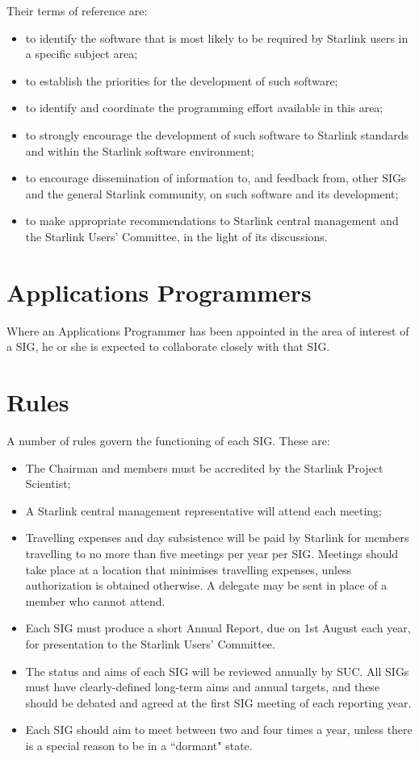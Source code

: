 Their terms of reference are:
\begin{itemize}
\item to identify the software that is most likely to be required by Starlink
users in a specific subject area;
\item to establish the priorities for the development of such software;
\item to identify and coordinate the programming effort available in this area;
\item to strongly encourage the development of such software to Starlink
standards and within the Starlink software environment;
\item to encourage dissemination of information to, and feedback from, other
SIGs and the general Starlink community, on such software and its development;
\item to make appropriate recommendations to Starlink central management and the
Starlink Users' Committee, in the light of its discussions.
\end{itemize}

\section{Applications Programmers}

Where an Applications Programmer has been appointed in the area of
interest of a SIG, he or she is expected to collaborate closely with that SIG.

\section{Rules}

A number of rules govern the functioning of each SIG.
These are:
\begin{itemize}
\item The Chairman and members must be accredited by the Starlink Project
Scientist;
\item A Starlink central management representative will attend each meeting;
\item Travelling expenses and day subsistence will be paid by Starlink for
members travelling to no more than five meetings per year per SIG.
Meetings should take place at a location that minimises travelling expenses,
unless authorization is obtained otherwise.
A delegate may be sent in place of a member who cannot attend.
\item Each SIG must produce a short Annual Report, due on 1st August each year,
for presentation to the Starlink Users' Committee.
\item The status and aims of each SIG will be reviewed annually by SUC.
All SIGs must have clearly-defined long-term aims and annual targets, and these
should be debated and agreed at the first SIG meeting of each reporting year.
\item Each SIG should aim to meet between two and four times a year, unless
there is a special reason to be in a ``dormant" state.
\end{itemize}

